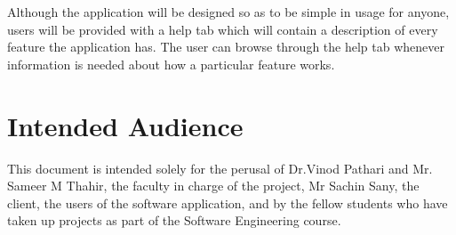 Although the application will be designed so as to be simple in usage for anyone, users will be provided with a help tab which will contain a description of every feature the application has. The user can browse through the help tab whenever information is needed about how a particular feature works.

\section{Intended Audience}
This document is intended solely for the perusal of Dr.Vinod Pathari and Mr. Sameer M Thahir, the faculty in charge of the project, Mr Sachin Sany, the client, the users of the software application, and by the fellow students who have taken up projects as part of the Software Engineering course.


